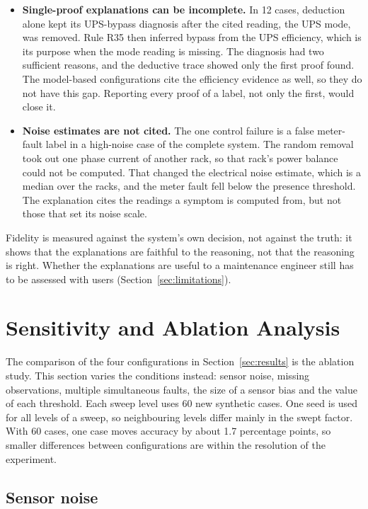 \begin{itemize}
  \item \textbf{Single-proof explanations can be incomplete.} In 12 cases, deduction alone kept its UPS-bypass diagnosis after the cited reading, the UPS mode, was removed. Rule R35 then inferred bypass from the UPS efficiency, which is its purpose when the mode reading is missing. The diagnosis had two sufficient reasons, and the deductive trace showed only the first proof found. The model-based configurations cite the efficiency evidence as well, so they do not have this gap. Reporting every proof of a label, not only the first, would close it.
  \item \textbf{Noise estimates are not cited.} The one control failure is a false meter-fault label in a high-noise case of the complete system. The random removal took out one phase current of another rack, so that rack's power balance could not be computed. That changed the electrical noise estimate, which is a median over the racks, and the meter fault fell below the presence threshold. The explanation cites the readings a symptom is computed from, but not those that set its noise scale.
\end{itemize}

Fidelity is measured against the system's own decision, not against the truth: it shows that the explanations are faithful to the reasoning, not that the reasoning is right. Whether the explanations are useful to a maintenance engineer still has to be assessed with users (Section~\ref{sec:limitations}).

\section{Sensitivity and Ablation Analysis}
\label{sec:sensitivity}

The comparison of the four configurations in Section~\ref{sec:results} is the ablation study. This section varies the conditions instead: sensor noise, missing observations, multiple simultaneous faults, the size of a sensor bias and the value of each threshold. Each sweep level uses 60 new synthetic cases. One seed is used for all levels of a sweep, so neighbouring levels differ mainly in the swept factor. With 60 cases, one case moves accuracy by about 1.7 percentage points, so smaller differences between configurations are within the resolution of the experiment.

\subsection{Sensor noise}

